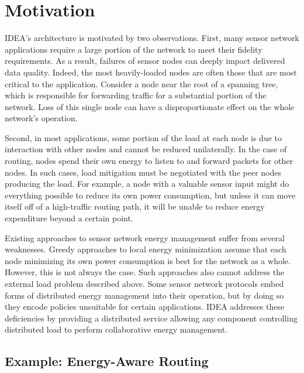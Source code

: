 \section{Motivation}
\label{idea-sec-motivation}

IDEA's architecture is motivated by two observations. First, many sensor
network applications require a large portion of the network to meet their
fidelity requirements. As a result, failures of sensor nodes can deeply
impact delivered data quality. Indeed, the most heavily-loaded nodes are
often those that are most critical to the application. Consider a node near
the root of a spanning tree, which is responsible for forwarding traffic for
a substantial portion of the network. Loss of this single node can have a
disproportionate effect on the whole network's operation.

Second, in most applications, some portion of the load at each node is due to
interaction with other nodes and cannot be reduced unilaterally. In the case
of routing, nodes spend their own energy to listen to and forward packets for
other nodes. In such cases, load mitigation must be negotiated with the peer
nodes producing the load. For example, a node with a valuable sensor input
might do everything possible to reduce its own power consumption, but unless
it can move itself off of a high-traffic routing path, it will be unable to
reduce energy expenditure beyond a certain point.

Existing approaches to sensor network energy management suffer from several
weaknesses. Greedy approaches to local energy minimization assume that each
node minimizing its own power consumption is best for the network as a whole.
However, this is not always the case. Such approaches also cannot address the
external load problem described above. Some sensor network protocols embed
forms of distributed energy management into their operation, but by doing so
they encode policies unsuitable for certain applications. IDEA addresses
these deficiencies by providing a distributed service allowing any component
controlling distributed load to perform collaborative energy management.

\subsection{Example: Energy-Aware Routing}

